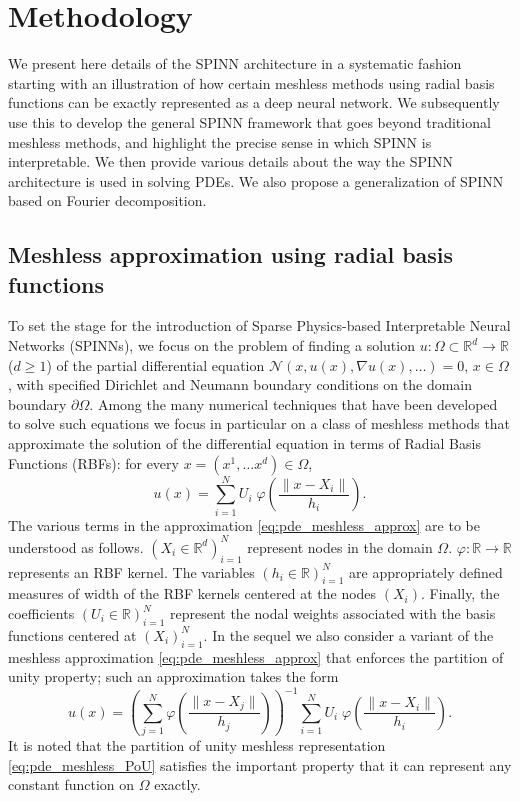 \documentclass[12pt]{article}
\begin{document}
\section{Methodology}
We present here details of the SPINN architecture in a systematic fashion starting with an illustration of how certain meshless methods using radial basis functions can be exactly represented as a deep neural network. We subsequently use this to develop the general SPINN framework that goes beyond traditional meshless methods, and highlight the precise sense in which SPINN is interpretable. We then provide various details about the way the SPINN architecture is used in solving PDEs. We also propose a generalization of SPINN based on Fourier decomposition.

\subsection{Meshless approximation using radial basis functions}
To set the stage for the introduction of Sparse Physics-based Interpretable Neural Networks (SPINNs), we focus on the problem of finding a solution $u:\Omega \subset \mathbb{R}^d \to \mathbb{R}$ ($d \ge 1$) of the partial differential equation $\mathcal{N}(x, u(x), \nabla u(x), \ldots) = 0$, $x \in \Omega$, with specified Dirichlet and Neumann boundary conditions on the domain boundary $\partial \Omega$. Among the many numerical techniques that have been developed to solve such equations we focus in particular on a class of meshless methods that approximate the solution of the differential equation in terms of Radial Basis Functions (RBFs): for every $x = (x^1, \ldots x^d) \in \Omega$,
\begin{equation} \label{eq:pde_meshless_approx}
u(x) = \sum_{i=1}^N U_i \; \varphi\left(\frac{\lVert x - X_i \rVert}{h_i}\right).
\end{equation}
The various terms in the approximation \eqref{eq:pde_meshless_approx} are to be understood as follows. $(X_i \in \mathbb{R}^d)_{i=1}^N$ represent nodes in the domain $\Omega$. $\varphi:\mathbb{R}\to \mathbb{R}$ represents an RBF kernel. The variables $(h_i \in \mathbb{R})_{i=1}^N$ are appropriately defined measures of width of the RBF kernels centered at the nodes $(X_i)$. Finally, the coefficients $(U_i \in \mathbb{R})_{i=1}^N$ represent the nodal weights associated with the basis functions centered at $(X_i)_{i=1}^N$. In the sequel we also consider a variant of the meshless approximation \eqref{eq:pde_meshless_approx} that enforces the partition of unity property; such an approximation takes the form
\begin{equation} \label{eq:pde_meshless_PoU}
u(x) = \left(\sum_{j=1}^N \varphi\left(\frac{\lVert x - X_j \rVert}{h_j}\right)\right)^{-1}\sum_{i=1}^N U_i  \; \varphi\left(\frac{\lVert x - X_i \rVert}{h_i}\right).
\end{equation}
It is noted that the partition of unity meshless representation \eqref{eq:pde_meshless_PoU} satisfies the important property that it can represent any constant function on $\Omega$ exactly.
\end{document}
